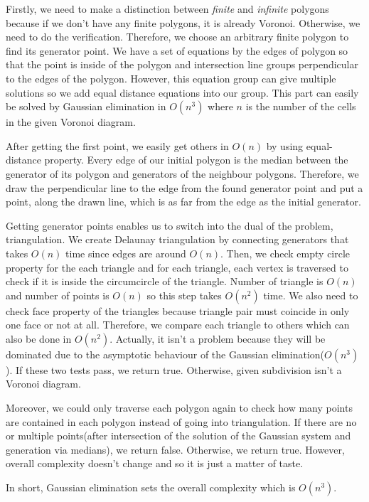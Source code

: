 Firstly, we need to make a distinction between \textit{finite} and \textit{infinite} polygons because if we don't have any finite polygons, it is already Voronoi. Otherwise, we need to do the verification. Therefore, we choose an arbitrary finite polygon to find its generator point. We have a set of equations by the edges of polygon so that the point is inside of the polygon and intersection line groups perpendicular to the edges of the polygon. However, this equation group can give multiple solutions so we add equal distance equations into our group. This part can easily be solved by Gaussian elimination in $O(n^3)$ where $n$ is the number of the cells in the given Voronoi diagram.

After getting the first point, we easily get others in $O(n)$ by using equal-distance property. Every edge of our initial polygon is the median between the generator of its polygon and generators of the neighbour polygons. Therefore, we draw the perpendicular line to the edge from the found generator point and put a point, along the drawn line, which is as far from the edge as the initial generator.

Getting generator points enables us to switch into the dual of the problem, triangulation. We create Delaunay triangulation by connecting generators that takes $O(n)$ time since edges are around $O(n)$. Then, we check empty circle property for the each triangle and for each triangle, each vertex is traversed to check if it is inside the circumcircle of the triangle. Number of triangle is $O(n)$ and number of points is $O(n)$ so this step takes $O(n^2)$ time. We also need to check face property of the triangles because triangle pair must coincide in only one face or not at all. Therefore, we compare each triangle to others which can also be done in $O(n^2)$. Actually, it isn't a problem because they will be dominated due to the asymptotic behaviour of the Gaussian elimination($O(n^3)$). If these two tests pass, we return true. Otherwise, given subdivision isn't a Voronoi diagram.

Moreover, we could only traverse each polygon again to check how many points are contained in each polygon instead of going into triangulation. If there are no or multiple points(after intersection of the solution of the Gaussian system and generation via medians), we return false. Otherwise, we return true. However, overall complexity doesn't change and so it is just a matter of taste.

In short, Gaussian elimination sets the overall complexity which is $O(n^3)$.